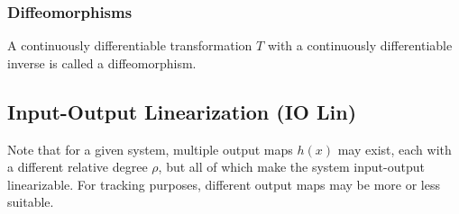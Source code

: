 \subsubsection{Diffeomorphisms}

A continuously differentiable transformation $T$ with a continuously differentiable inverse is called a diffeomorphism.

\subsection{Input-Output Linearization (IO Lin)}\label{IO_linearization}
Note that for a given system, multiple output maps $h(x)$ may exist, each with a different relative degree $\rho$, but all of which make the system input-output linearizable. For tracking purposes, different output maps may be more or less suitable.
